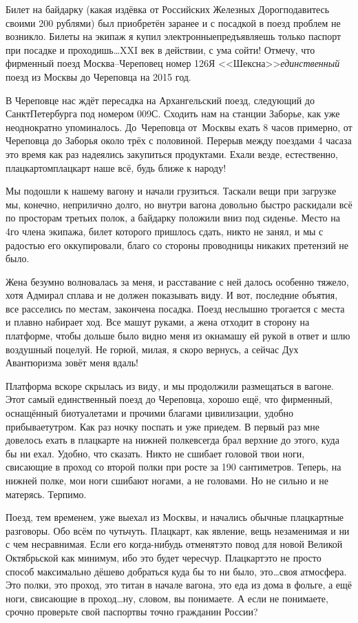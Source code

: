 Билет на байдарку (какая издёвка от Российских Железных Дорог\mdash подавитесь своими 200 рублями) был приобретён заранее и с посадкой в поезд проблем не возникло. Билеты на экипаж я купил электронные\mdash предъявляешь только паспорт при посадке и проходишь\ldots XXI век в действии, с ума сойти! Отмечу, что фирменный поезд Москва\nobreakdash--Череповец номер 126Я <<Шексна>>\mdash \textit{единственный} поезд из Москвы до Череповца на 2015 год. 
 
В Череповце нас ждёт пересадка на Архангельский поезд, следующий до Санкт\sdash Петербурга под номером 009С. Сходить нам на станции Заборье, как уже неоднократно упоминалось. До~Череповца от~Москвы ехать 8 часов примерно, от Череповца до Заборья около трёх с половиной. Перерыв между поездами 4 часа\mdash за это время как раз надеялись закупиться продуктами. Ехали везде, естественно, плацкартом\mdash плацкарт наше всё, будь ближе к народу! 

Мы подошли к нашему вагону и начали грузиться. Таскали вещи при загрузке мы, конечно, неприлично долго, но внутри вагона довольно быстро раскидали всё по просторам третьих полок, а байдарку положили вниз под сиденье. Место на 4\sdash го члена экипажа, билет которого пришлось сдать, никто не занял, и мы с радостью его оккупировали, благо со стороны проводницы никаких претензий не было.

Жена безумно волновалась за меня, и расставание с ней далось особенно тяжело, хотя Адмирал сплава и не должен показывать виду. И вот, последние объятия, все расселись по местам, закончена посадка. Поезд неслышно трогается с места и плавно набирает ход. Все машут руками, а жена отходит в сторону на платформе, чтобы дольше было видно меня из окна\mdash машу ей рукой в ответ и шлю воздушный поцелуй. Не горюй, милая, я скоро вернусь, а сейчас Дух Авантюризма зовёт меня вдаль!

Платформа вскоре скрылась из виду, и мы продолжили размещаться в вагоне. Этот самый единственный поезд до Череповца, хорошо ещё, что фирменный, оснащённый биотуалетами и прочими благами цивилизации, удобно прибывает\mdash утром. Как раз ночку поспать и уже приедем. В первый раз мне довелось ехать в плацкарте на нижней полке\mdash всегда брал верхние до этого, куда бы ни ехал. Удобно, что сказать. Никто не сшибает головой твои ноги, свисающие в проход со второй полки при росте за 190 сантиметров. Теперь, на нижней полке, мои ноги сшибают ногами, а не головами. Но не сильно и не матерясь. Терпимо. 

Поезд, тем временем, уже выехал из Москвы, и начались обычные плацкартные разговоры.  Обо всём по чуть\sdash чуть. Плацкарт, как явление, вещь незаменимая и ни с чем несравнимая. Если его когда-нибудь отменят\mdash это повод для новой Великой Октябрьской как минимум, ибо это будет чересчур. Плацкарт\mdash это не просто способ максимально дёшево добраться куда бы то ни было, это\ldots своя атмосфера. Это полки, это проход, это титан в начале вагона, это еда из дома в фольге, а ещё ноги, свисающие в проход\ldots ну, словом, вы понимаете. А если не понимаете, срочно проверьте свой паспорт\mdash вы точно гражданин России? 

